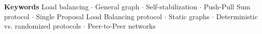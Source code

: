 \textbf{Keywords} Load balancing $\cdot$ General graph $\cdot$ Self-stabilization $\cdot$ Push-Pull Sum protocol $\cdot$ Single Proposal Load Balancing protocol $\cdot$ Static graphs $\cdot$ Deterministic vs. randomized protocols $\cdot$ Peer-to-Peer networks

\renewcommand{\clearpage}{}